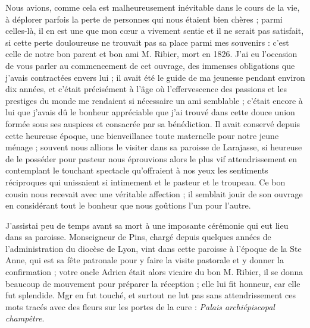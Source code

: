 \documentclass[11pt,a4paper]{report}
\begin{document}
Nous avions, comme cela est malheureusement inévitable dans le cours de la vie, à déplorer parfois la perte de personnes qui nous étaient bien chères ; parmi celles-là, il en est une que mon cœur a vivement sentie et il ne serait pas satisfait, si cette perte douloureuse ne trouvait pas sa place parmi mes souvenirs : c'est celle de notre bon parent et bon ami M. Ribier, mort en 1826. J'ai eu l'occasion de vous parler au commencement de cet ouvrage, des immenses obligations que j'avais contractées envers lui ; il avait été le guide de ma jeunesse pendant environ dix années, et c'était précisément à l'âge où l'effervescence des passions et les prestiges du monde me rendaient si nécessaire un ami semblable ; c'était encore à lui que j'avais dû le bonheur appréciable que j'ai trouvé dans cette douce union formée sous ses auspices et consacrée par sa bénédiction. Il avait conservé depuis cette heureuse époque, une bienveillance toute maternelle pour notre jeune ménage ; souvent nous allions le visiter dans sa paroisse de Larajasse, si heureuse de le posséder pour pasteur nous éprouvions alors le plus vif attendrissement en contemplant le touchant spectacle qu'offraient à nos yeux les sentiments réciproques qui unissaient si intimement et le pasteur et le troupeau. Ce bon cousin nous recevait avec une véritable affection ; il semblait jouir de son ouvrage en considérant tout le bonheur que nous goûtions l'un pour l'autre.

J'assistai peu de temps avant sa mort à une imposante cérémonie qui eut lieu dans sa paroisse. Monseigneur de Pins, chargé depuis quelques années de l'administration du diocèse de Lyon, vint dans cette paroisse à l'époque de la Ste Anne, qui est sa fête patronale pour y faire la visite pastorale et y donner la confirmation ; votre oncle Adrien était alors vicaire du bon M. Ribier, il se donna beaucoup de mouvement pour préparer la réception ; elle lui fit honneur, car elle fut splendide. Mgr en fut touché, et surtout ne lut pas sans attendrissement ces mots tracés avec des fleurs sur les portes de la cure : \textit{Palais archiépiscopal champêtre}.
\end{document}
